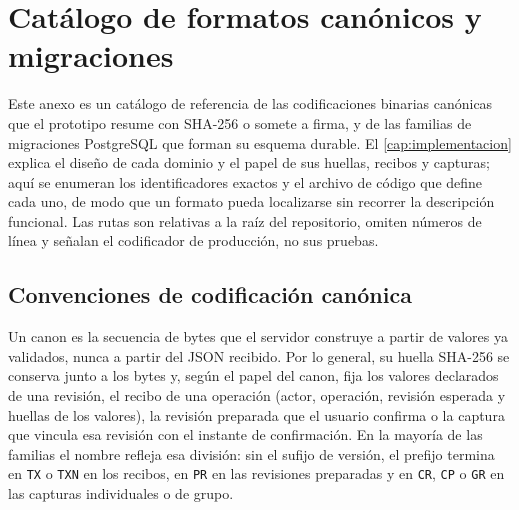 \chapter{Catálogo de formatos canónicos y migraciones}\label{anexo:A}

Este anexo es un catálogo de referencia de las codificaciones binarias canónicas que el prototipo resume con SHA-256 o somete a firma, y de las familias de migraciones PostgreSQL que forman su esquema durable. El \cref{cap:implementacion} explica el diseño de cada dominio y el papel de sus huellas, recibos y capturas; aquí se enumeran los identificadores exactos y el archivo de código que define cada uno, de modo que un formato pueda localizarse sin recorrer la descripción funcional. Las rutas son relativas a la raíz del repositorio, omiten números de línea y señalan el codificador de producción, no sus pruebas.

\section{Convenciones de codificación canónica}\label{sec:anexo-canones-convenciones}

Un canon es la secuencia de bytes que el servidor construye a partir de valores ya validados, nunca a partir del JSON recibido. Por lo general, su huella SHA-256 se conserva junto a los bytes y, según el papel del canon, fija los valores declarados de una revisión, el recibo de una operación (actor, operación, revisión esperada y huellas de los valores), la revisión preparada que el usuario confirma o la captura que vincula esa revisión con el instante de confirmación. En la mayoría de las familias el nombre refleja esa división: sin el sufijo de versión, el prefijo termina en \texttt{TX} o \texttt{TXN} en los recibos, en \texttt{PR} en las revisiones preparadas y en \texttt{CR}, \texttt{CP} o \texttt{GR} en las capturas individuales o de grupo.

